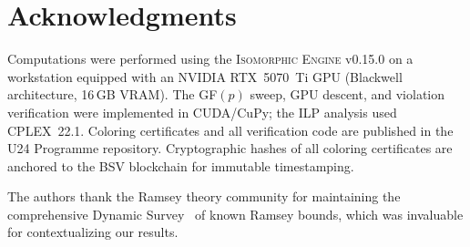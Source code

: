 \documentclass[12pt,a4paper]{article}
\theoremstyle{definition}
\theoremstyle{remark}
\begin{document}

\section*{Acknowledgments}

Computations were performed using the \textsc{Isomorphic Engine} v0.15.0 on a workstation equipped with an NVIDIA RTX~5070~Ti GPU (Blackwell architecture, 16\,GB VRAM).  The GF$(p)$ sweep, GPU descent, and violation verification were implemented in CUDA/CuPy; the ILP analysis used CPLEX~22.1.  Coloring certificates and all verification code are published in the U24 Programme repository.  Cryptographic hashes of all coloring certificates are anchored to the BSV blockchain for immutable timestamping.

The authors thank the Ramsey theory community for maintaining the comprehensive Dynamic Survey~\cite{radziszowski2021} of known Ramsey bounds, which was invaluable for contextualizing our results.

\end{document}
